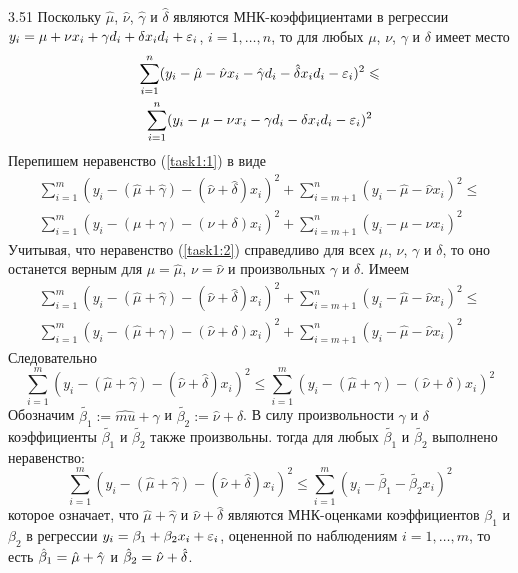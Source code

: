 \begin{solution}{{3.51}}
Поскольку $\hat{\mu}$, $\hat{\nu}$, $\hat{\gamma}$ и $\hat{\delta}$ являются МНК-коэффициентами в регрессии $y_i = \mu + \nu x_i + \gamma d_i + \delta x_i d_i + \varepsilon_i$, $i = 1, \ldots, n$, то для любых $\mu$, $\nu$, $\gamma$ и $\delta$ имеет место
\begin{multline}
\label{task1:1}\sum_{i=1}^n (y_i - \hat{\mu} - \hat{\nu} x_i - \hat{\gamma} d_i - \hat{\delta} x_i d_i - \varepsilon_i)^2 \leqslant \\
\sum_{i=1}^n (y_i - \mu - \nu x_i - \gamma d_i - \delta x_i d_i - \varepsilon_i)^2
\end{multline}
Перепишем неравенство (\ref{task1:1}) в виде
\begin{multline}
\label{task1:2}\sum_{i=1}^m (y_i - (\hat{\mu} + \hat{\gamma}) - (\hat{\nu} + \hat{\delta}) x_i)^2 + \sum_{i= m + 1}^n (y_i - \hat{\mu} - \hat{\nu} x_i)^2 \leqslant \\
\sum_{i=1}^m (y_i - ({\mu} + {\gamma}) - ({\nu} + {\delta}) x_i)^2 + \sum_{i= m + 1}^n (y_i - {\mu} - {\nu} x_i)^2
\end{multline}
Учитывая, что неравенство (\ref{task1:2}) справедливо для всех $\mu$, $\nu$, $\gamma$ и $\delta$, то оно останется верным для $\mu = \hat{\mu}$, $\nu = \hat{\nu}$ и произвольных $\gamma$ и $\delta$. Имеем
\begin{multline*}
\sum_{i=1}^m (y_i - (\hat{\mu} + \hat{\gamma}) - (\hat{\nu} + \hat{\delta}) x_i)^2 + \sum_{i= m + 1}^n (y_i - \hat{\mu} - \hat{\nu} x_i)^2 \leqslant \\
 \sum_{i=1}^m (y_i - (\hat{\mu} + {\gamma}) - (\hat{\nu} + {\delta}) x_i)^2 + \sum_{i= m + 1}^n (y_i - \hat{\mu} - \hat{\nu} x_i)^2
\end{multline*}
Следовательно
\begin{equation*}
\sum_{i=1}^m (y_i - (\hat{\mu} + \hat{\gamma}) - (\hat{\nu} + \hat{\delta}) x_i)^2 \leqslant \sum_{i=1}^m (y_i - (\hat{\mu} + {\gamma}) - (\hat{\nu} + {\delta}) x_i)^2
\end{equation*}
Обозначим $\tilde{\beta_1} := \hat{mu} + \gamma$ и $\tilde{\beta_2} := \hat{\nu} + \delta$. В силу произвольности $\gamma$ и $\delta$ коэффициенты $\tilde{\beta_1}$ и $\tilde{\beta_2}$ также произвольны. тогда для любых $\tilde{\beta_1}$ и $\tilde{\beta_2}$ выполнено неравенство:
\[
\sum_{i=1}^m (y_i - (\hat{\mu} + \hat{\gamma}) - (\hat{\nu} + \hat{\delta}) x_i)^2 \leqslant \sum_{i=1}^m (y_i - \tilde{\beta_1} - \tilde{\beta_2} x_i)^2
\]
которое означает, что $\hat{\mu} + \hat{\gamma}$ и $\hat{\nu} + \hat{\delta}$ являются МНК-оценками коэффициентов $\beta_1$ и $\beta_2$ в регрессии $y_i = \beta_1 + \beta_2 x_i + \varepsilon_i$, оцененной по наблюдениям $i = 1, \ldots, m$, то есть $\hat{\beta}_1 = \hat{\mu} + \hat{\gamma}$ и $\hat{\beta}_2 = \hat{\nu} + \hat{\delta}$.
\end{solution}
